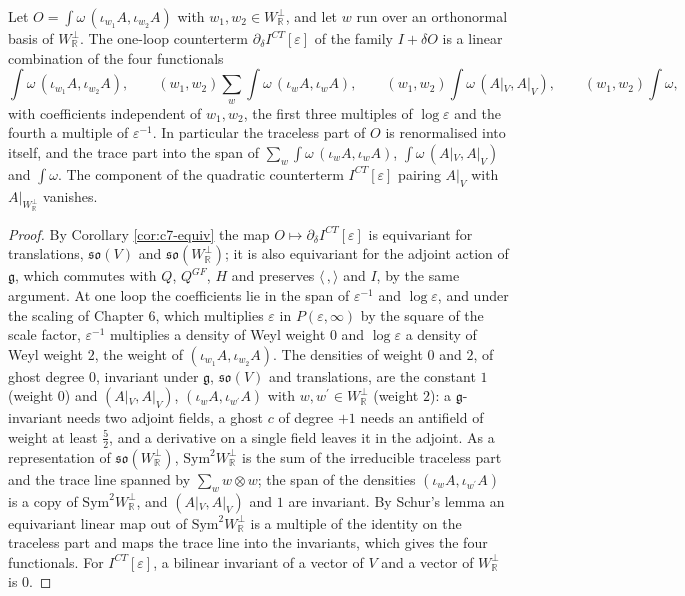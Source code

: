 \begin{corollary}
\label{cor:c7-schur}
Let $O=\int\omega\,(\iota_{w_1}A,\iota_{w_2}A)$ with $w_1,w_2\in W_{\mathbb R}^\perp$, and let $w$ run over an orthonormal basis of $W_{\mathbb R}^\perp$. The one-loop counterterm $\partial_\delta I^{CT}[\varepsilon]$ of the family $I+\delta O$ is a linear combination of the four functionals
\[
\int\omega\,(\iota_{w_1}A,\iota_{w_2}A),\qquad (w_1,w_2)\sum_w\int\omega\,(\iota_wA,\iota_wA),\qquad (w_1,w_2)\int\omega\,(A|_V,A|_V),\qquad (w_1,w_2)\int\omega ,
\]
with coefficients independent of $w_1,w_2$, the first three multiples of $\log\varepsilon$ and the fourth a multiple of $\varepsilon^{-1}$. In particular the traceless part of $O$ is renormalised into itself, and the trace part into the span of $\sum_w\int\omega\,(\iota_wA,\iota_wA)$, $\int\omega\,(A|_V,A|_V)$ and $\int\omega$. The component of the quadratic counterterm $I^{CT}[\varepsilon]$ pairing $A|_V$ with $A|_{W_{\mathbb R}^\perp}$ vanishes.
\end{corollary}

\begin{proof}
By Corollary \ref{cor:c7-equiv} the map $O\mapsto\partial_\delta I^{CT}[\varepsilon]$ is equivariant for translations, $\mathfrak{so}(V)$ and $\mathfrak{so}(W_{\mathbb R}^\perp)$; it is also equivariant for the adjoint action of $\mathfrak g$, which commutes with $Q$, $Q^{GF}$, $H$ and preserves $\langle\,,\rangle$ and $I$, by the same argument. At one loop the coefficients lie in the span of $\varepsilon^{-1}$ and $\log\varepsilon$, and under the scaling of Chapter 6, which multiplies $\varepsilon$ in $P(\varepsilon,\infty)$ by the square of the scale factor, $\varepsilon^{-1}$ multiplies a density of Weyl weight $0$ and $\log\varepsilon$ a density of Weyl weight $2$, the weight of $(\iota_{w_1}A,\iota_{w_2}A)$. The densities of weight $0$ and $2$, of ghost degree $0$, invariant under $\mathfrak g$, $\mathfrak{so}(V)$ and translations, are the constant $1$ (weight $0$) and $(A|_V,A|_V)$, $(\iota_wA,\iota_{w^{\prime}}A)$ with $w,w^{\prime}\in W_{\mathbb R}^\perp$ (weight $2$): a $\mathfrak g$-invariant needs two adjoint fields, a ghost $c$ of degree $+1$ needs an antifield of weight at least $\tfrac52$, and a derivative on a single field leaves it in the adjoint. As a representation of $\mathfrak{so}(W_{\mathbb R}^\perp)$, $\mathrm{Sym}^2W_{\mathbb R}^\perp$ is the sum of the irreducible traceless part and the trace line spanned by $\sum_w w\otimes w$; the span of the densities $(\iota_wA,\iota_{w^{\prime}}A)$ is a copy of $\mathrm{Sym}^2W_{\mathbb R}^\perp$, and $(A|_V,A|_V)$ and $1$ are invariant. By Schur's lemma an equivariant linear map out of $\mathrm{Sym}^2W_{\mathbb R}^\perp$ is a multiple of the identity on the traceless part and maps the trace line into the invariants, which gives the four functionals. For $I^{CT}[\varepsilon]$, a bilinear invariant of a vector of $V$ and a vector of $W_{\mathbb R}^\perp$ is $0$.
\end{proof}


